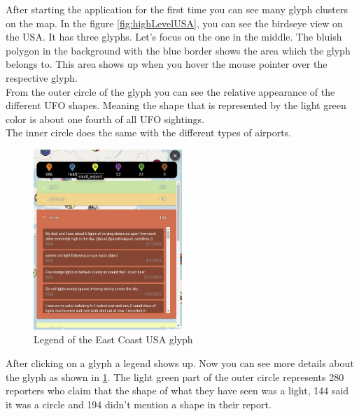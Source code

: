 \documentclass{article}
\begin{document}
After starting the application for the first time you can see many glyph clusters on the map. In the figure \ref{fig:highLevelUSA}, you can see the birdseye view on the USA. It has three glyphs. Let's focus on the one in the middle. The bluish polygon in the background with the blue border shows the area which the glyph belongs to. This area shows up when you hover the mouse pointer over the respective glyph.
\\
From the outer circle of the glyph you can see the relative appearance of the different UFO shapes. Meaning the shape that is represented by the light green color is about one fourth of all UFO sightings.
\\
The inner circle does the same with the different types of airports.
\\

\begin{figure} 
    \centering
    \includegraphics[width=0.5\textwidth]{legendEastCostUsa2}
    \caption{Legend of the East Coast USA glyph}
    \label{fig:legendEastCostUsa2}
\end{figure}

After clicking on a glyph a legend shows up. 
Now you can see more details about the glyph as shown in \ref{fig:legendEastCostUsa2}. 
The light green part of the outer circle represents 280 reporters who claim that the shape 
of what they have seen was a light, 144 said it was a circle and 194 
didn't mention a shape in their report. \\
\end{document}
